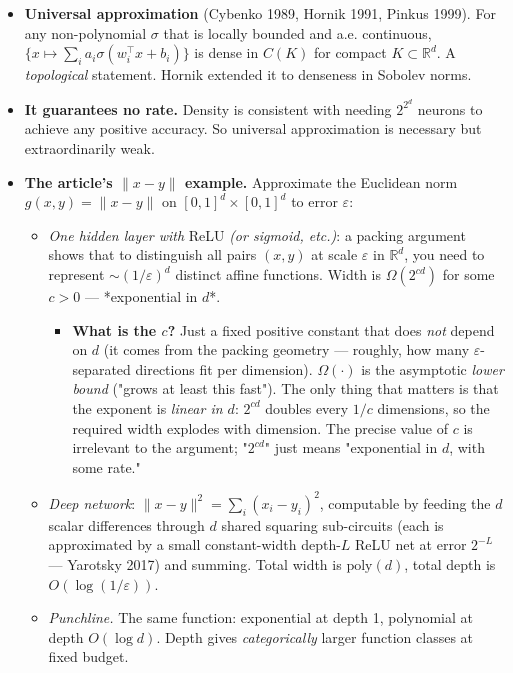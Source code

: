 \documentclass[11pt]{article}
\begin{document}
\begin{itemize}
\item \textbf{Universal approximation} (Cybenko 1989, Hornik 1991, Pinkus 1999).
For any non-polynomial $\sigma$ that is locally bounded and a.e.
continuous, $\{x \mapsto \sum_i a_i \sigma(w_i^\top x + b_i)\}$ is dense
in $C(K)$ for compact $K \subset \mathbb R^d$. A \emph{topological} statement.
Hornik extended it to denseness in Sobolev norms.
\item \textbf{It guarantees no rate.} Density is consistent with needing $2^{2^d}$
neurons to achieve any positive accuracy. So universal approximation is
necessary but extraordinarily weak.
\item \textbf{The article's $\|x - y\|$ example.} Approximate the Euclidean norm
$g(x, y) = \|x - y\|$ on $[0,1]^d \times [0,1]^d$ to error $\varepsilon$:
\begin{itemize}
\item \emph{One hidden layer with} ReLU \emph{(or sigmoid, etc.)}: a packing argument
shows that to distinguish all pairs $(x, y)$ at scale $\varepsilon$ in
$\mathbb R^d$, you need to represent $\sim (1/\varepsilon)^d$ distinct
affine functions. Width is $\Omega(2^{cd})$ for some $c > 0$ --- *exponential
in $d$*.
\begin{itemize}
\item \textbf{What is the $c$?} Just a fixed positive constant that does \emph{not}
depend on $d$ (it comes from the packing geometry --- roughly, how many
$\varepsilon$-separated directions fit per dimension). $\Omega(\cdot)$
is the asymptotic \emph{lower bound} ("grows at least this fast"). The only
thing that matters is that the exponent is \emph{linear in $d$}: $2^{cd}$
doubles every $1/c$ dimensions, so the required width explodes with
dimension. The precise value of $c$ is irrelevant to the argument;
"$2^{cd}$" just means "exponential in $d$, with some rate."
\end{itemize}
\item \emph{Deep network}: $\|x - y\|^2 = \sum_i (x_i - y_i)^2$, computable by
feeding the $d$ scalar differences through $d$ shared squaring
sub-circuits (each is approximated by a small constant-width depth-$L$
ReLU net at error $2^{-L}$ --- Yarotsky 2017) and summing. Total width is
$\mathrm{poly}(d)$, total depth is $O(\log(1/\varepsilon))$.
\item \emph{Punchline.} The same function: exponential at depth 1, polynomial at
depth $O(\log d)$. Depth gives \emph{categorically} larger function classes
at fixed budget.

\end{itemize}
\end{itemize}
\end{document}
